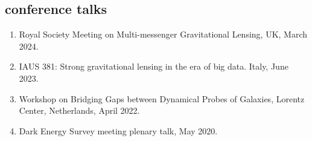 \documentclass[margin, line]{res}
\begin{document}
\begin{resume}
\section{ conference talks}
\begin{enumerate}
	\item Royal Society Meeting on Multi-messenger Gravitational Lensing, UK, March 2024.
	\item IAUS 381: Strong gravitational lensing in the era of big data. Italy, June 2023.
	\item Workshop on Bridging Gaps between Dynamical Probes of Galaxies, Lorentz Center, Netherlands, April 2022.
	\item Dark Energy Survey meeting plenary talk, May 2020.	 %
\end{enumerate}


\end{resume}
\end{document}
